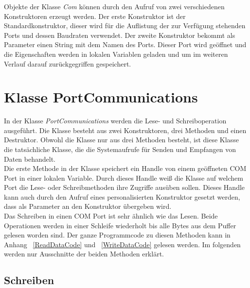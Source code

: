 Objekte der Klasse \textit{Com} können durch den Aufruf von zwei verschiedenen Konstruktoren erzeugt werden. Der erste Konstruktor ist der Standardkonstruktor, dieser wird für die Auflistung der zur Verfügung stehenden Ports und dessen Baudraten verwendet. Der zweite Konstruktor bekommt als Parameter einen String mit dem Namen des Ports. Dieser Port wird geöffnet und die Eigenschaften werden in lokalen Variablen geladen und um im weiteren Verlauf darauf zurückgegriffen gespeichert.
 
\newpage


\section{Klasse PortCommunications}\label{PortCommClass}
\paragraph{}
In der Klasse \textit{PortCommunications} werden die Lese- und Schreiboperation ausgeführt. Die Klasse besteht aus zwei Konstruktoren, drei Methoden und einen Destruktor. Obwohl die Klasse nur aus drei Methoden besteht, ist diese  Klasse die tatsächliche Klasse, die die Systemaufrufe für Senden und Empfangen von Daten behandelt.\\

Die erste Methode in der Klasse speichert ein Handle von einem geöffneten COM Port in einer lokalen Variable. Durch dieses Handle weiß die Klasse auf welchem Port die Lese- oder Schreibmethoden ihre Zugriffe ausüben sollen. Dieses Handle kann auch durch den Aufruf eines personalisierten Konstruktor gesetzt werden, dass als Parameter an den Konstruktor übergeben wird.\\

Das Schreiben in einen COM Port ist sehr ähnlich wie das Lesen. Beide Operationen werden in einer Schleife wiederholt bis alle Bytes aus dem Puffer gelesen worden sind. Der ganze Programmcode zu diesen Methoden kann in Anhang ~\ref{ReadDataCode} und ~\ref{WriteDataCode} gelesen werden. Im folgenden werden nur Ausschnitte der beiden Methoden erklärt.\\

\subsection{Schreiben}\label{SchreibenPortCommClass}
